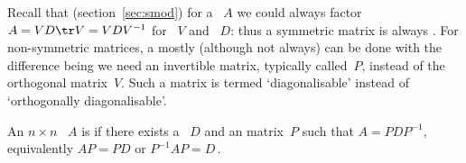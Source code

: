 Recall that (section~\ref{sec:smod}) for a ~\(A\) we could always factor \(A=VD\tr V=VDV^{-1}\) for ~\(V\) and ~\(D\): thus a symmetric matrix is always .
For non-symmetric matrices, a  mostly (although not always) can be done with the difference being we need an invertible matrix, typically called~\(P\), instead of the orthogonal matrix~\(V\).
Such a matrix is termed `diagonalisable' instead of `orthogonally diagonalisable'.


\begin{definition} \label{def:diagonalise} 
An \(n\times n\) ~\(A\) is  if there exists a ~\(D\) and an  matrix~\(P\) such that \(A=PDP^{-1}\), equivalently \(AP=PD\) or \(P^{-1}AP=D\)\,.
\end{definition}


